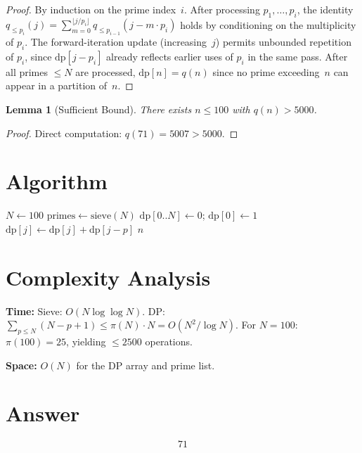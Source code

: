 \documentclass[11pt]{article}
\newtheorem{lemma}[theorem]{Lemma}
\begin{document}
\begin{proof}
By induction on the prime index~$i$. After processing $p_1, \ldots, p_i$, the identity $q_{\le p_i}(j) = \sum_{m=0}^{\lfloor j/p_i \rfloor} q_{\le p_{i-1}}(j - m \cdot p_i)$ holds by conditioning on the multiplicity of $p_i$. The forward-iteration update (increasing~$j$) permits unbounded repetition of $p_i$, since $\mathrm{dp}[j - p_i]$ already reflects earlier uses of $p_i$ in the same pass. After all primes $\leq N$ are processed, $\mathrm{dp}[n] = q(n)$ since no prime exceeding~$n$ can appear in a partition of~$n$.
\end{proof}

\begin{lemma}[Sufficient Bound]
There exists $n \leq 100$ with $q(n) > 5000$.
\end{lemma}

\begin{proof}
Direct computation: $q(71) = 5007 > 5000$.
\end{proof}

\section{Algorithm}

\begin{algorithm}[H]
\caption{Find first $n$ with $q(n) > 5000$}
\begin{algorithmic}[1]
\STATE $N \gets 100$
\STATE $\text{primes} \gets \text{sieve}(N)$
\STATE $\mathrm{dp}[0..N] \gets 0$; $\mathrm{dp}[0] \gets 1$
        \STATE $\mathrm{dp}[j] \gets \mathrm{dp}[j] + \mathrm{dp}[j - p]$
    \ENDFOR
\ENDFOR
{}
        \RETURN $n$
    \ENDIF
\ENDFOR
\end{algorithmic}
\end{algorithm}

\section{Complexity Analysis}

\textbf{Time:} Sieve: $O(N \log \log N)$. DP: $\sum_{p \leq N}(N - p + 1) \leq \pi(N) \cdot N = O(N^2 / \log N)$. For $N = 100$: $\pi(100) = 25$, yielding $\leq 2500$ operations.

\textbf{Space:} $O(N)$ for the DP array and prime list.

\section{Answer}

\[
\boxed{71}
\]
\end{document}
